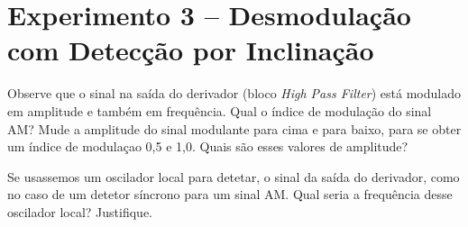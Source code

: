 \documentclass[12pt,addpoints]{exam}
\begin{document}
\section*{Experimento 3 -- Desmodulação com Detecção por Inclinação}

\begin{questions}
    \question Observe que o sinal na saída do derivador (bloco {\em High Pass Filter}) está modulado em amplitude e também em frequência. Qual o índice de modulação do sinal AM? Mude a amplitude do sinal modulante para cima e para baixo, para se obter um índice de modulaçao 0,5 e 1,0. Quais são esses valores de amplitude? %
    \fillwithlines{1in}

    \question Se usassemos um oscilador local para detetar, o sinal da saída do derivador, como no caso de um detetor síncrono para um sinal AM. Qual seria a frequência desse oscilador local? Justifique.
    \fillwithlines{1in}

\end{questions}


    
\end{document}
